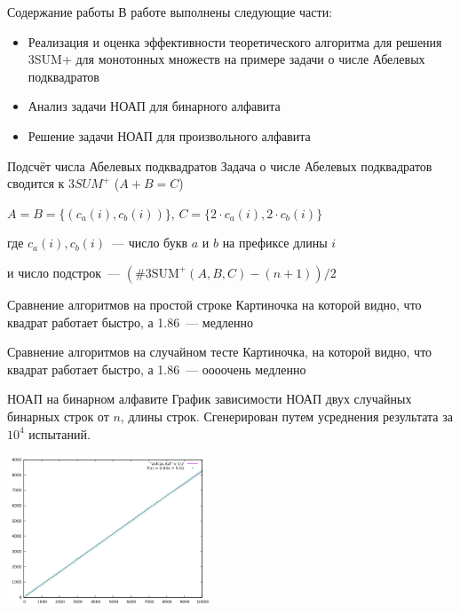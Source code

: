 \documentclass[hyperref=unicode,graphics=pdflatex,12pt]{beamer}
\begin{document}
\begin{frame}{Содержание работы}
\hspace{0.5cm}
В работе выполнены следующие части:
\begin{itemize}
\item<1-> Реализация и оценка эффективности теоретического алгоритма для решения 3SUM+
  для монотонных множеств на примере задачи о числе Абелевых подквадратов
\item<2-> Анализ задачи НОАП для бинарного алфавита
\item<3-> Решение задачи НОАП для произвольного алфавита
\end{itemize}
\end{frame}

\begin{frame}{Подсчёт числа Абелевых подквадратов}
Задача о числе Абелевых подквадратов сводится к $3SUM^+$ ($A + B = C$)
\vspace{0.5cm}

 $A = B = \{(c_a(i), c_b(i))\}$, $C = \{2 \cdot c_a(i), 2 \cdot c_b(i)\}$
\vspace{0.5cm}

где $c_a(i), c_b(i)$~--- число букв $a$ и $b$ на префиксе длины $i$
\vspace{0.5cm}

 и число подстрок~--- $(\#3\text{SUM}^+(A, B, C) - (n + 1)) / 2$

\end{frame}

\begin{frame}{Сравнение алгоритмов на простой строке}
Картиночка на которой видно, что квадрат работает быстро, а 1.86~--- медленно
\end{frame}

\begin{frame}{Сравнение алгоритмов на случайном тесте}
Картиночка, на которой видно, что квадрат работает быстро, а 1.86~--- оооочень медленно
\end{frame}

\begin{frame}{НОАП на бинарном алфавите}
График зависимости НОАП двух случайных бинарных строк от $n$, длины строк. Сгенерирован путем усреднения результата за $10^4$ испытаний.
\begin{center}
\includegraphics[width=6cm]{pics/avlcas.png}
\end{center}
\end{frame}
\end{document}
